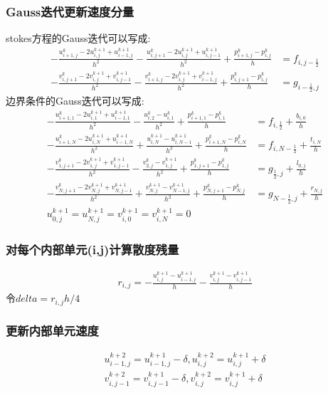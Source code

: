 \documentclass{article}
\begin{document}
\subsubsection*{Gauss迭代更新速度分量}
stokes方程的Gauss迭代可以写成:
\begin{align*}
-\frac{u^k_{i+1,j}-2u^{k+1}_{i,j}+u^{k+1}_{i-1,j}}{h^2}
-\frac{u^k_{i,j+1}-2u^{k+1}_{i,j}+u^{k+1}_{i,j-1}}{h^2}
+\frac{p^k_{i+1,j}-p^k_{i,j}}{h}
&= f_{i,j-\frac{1}{2}}\\
-\frac{v^k_{i,j+1}-2v^{k+1}_{i,j}+v^{k+1}_{i,j-1}}{h^2}
-\frac{v^k_{i+1,j}-2v^{k+1}_{i,j}+v^{k+1}_{i-1,j}}{h^2}
+\frac{p^k_{i,j+1}-p^k_{i,j}}{h}
&= g_{i-\frac{1}{2},j}
\end{align*}
边界条件的Gauss迭代可以写成:
\begin{align*}
-\frac{u^k_{i+1,1}-2u^{k+1}_{i,1}+u^{k+1}_{i-1,1}}{h^2}
-\frac{u^k_{i,2}-u^k_{i,1}}{h^2}
+\frac{p^k_{i+1,1}-p^k_{i,1}}{h}
&= f_{i,\frac{1}{2}}+\frac{b_{i,0}}{h}\\
-\frac{u^k_{i+1,N}-2u^{k+1}_{i,N}+u^{k+1}_{i-1,N}}{h^2}
+\frac{u^{k+1}_{i,N}-u^{k+1}_{i,N-1}}{h^2}
+\frac{p^k_{i+1,N}-p^k_{i,N}}{h}
&= f_{i,N-\frac{1}{2}}+\frac{t_{i,N}}{h}\\
-\frac{v^k_{1,j+1}-2v^{k+1}_{1,j}+v^{k+1}_{1,j-1}}{h^2}
-\frac{v^k_{2,j}-v^{k+1}_{1,j}}{h^2}
+\frac{p^k_{1,j+1}-p^k_{1,j}}{h}
&= g_{\frac{1}{2},j}+\frac{l_{0,j}}{h}\\
-\frac{v^k_{N,j+1}-2v^{k+1}_{N,j}+v^{k+1}_{N,j-1}}{h^2}
+\frac{v^{k+1}_{N,j}-v^{k+1}_{N-1,j}}{h^2}
+\frac{p^k_{N,j+1}-p^k_{N,j}}{h}
&= g_{N-\frac{1}{2},j}+\frac{r_{N,j}}{h}\\
u^{k+1}_{0,j}=u^{k+1}_{N,j}
=v^{k+1}_{i,0}=v^{k+1}_{i,N}=0
\end{align*}
\subsubsection*{对每个内部单元(i,j)计算散度残量}
\begin{align*}
r_{i,j} = -\frac{u^{k+1}_{i,j}-u^{k+1}_{i-1,j}}{h}
-\frac{v^{k+1}_{i,j}-v^{k+1}_{i,j-1}}{h}
\end{align*}
令$delta = r_{i,j}h/4$
\subsubsection*{更新内部单元速度}
\begin{align*}
u^{k+2}_{i-1,j} = u^{k+1}_{i-1,j}-\delta,
u^{k+2}_{i,j} = u^{k+1}_{i,j}+\delta\\
v^{k+2}_{i,j-1} = v^{k+1}_{i,j-1}-\delta,
v^{k+2}_{i,j} = v^{k+1}_{i,j}+\delta
\end{align*}
\end{document}
